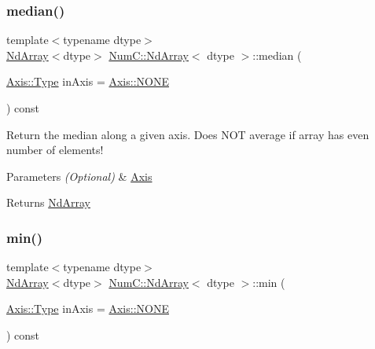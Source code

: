 \subsubsection{\texorpdfstring{median()}{median()}}
{\footnotesize\ttfamily template$<$typename dtype$>$ \\
\mbox{\hyperlink{class_num_c_1_1_nd_array}{Nd\+Array}}$<$dtype$>$ \mbox{\hyperlink{class_num_c_1_1_nd_array}{Num\+C\+::\+Nd\+Array}}$<$ dtype $>$\+::median (\begin{DoxyParamCaption}\item[{\mbox{\hyperlink{struct_num_c_1_1_axis_a8e689044ef1941a03482e730c5e7ebb3}{Axis\+::\+Type}}}]{in\+Axis = {\ttfamily \mbox{\hyperlink{struct_num_c_1_1_axis_a8e689044ef1941a03482e730c5e7ebb3a0ae033c4226f7184bf0050b101e7ed94}{Axis\+::\+N\+O\+NE}}} }\end{DoxyParamCaption}) const\hspace{0.3cm}{\ttfamily [inline]}}

Return the median along a given axis. Does N\+OT average if array has even number of elements!


\begin{DoxyParams}{Parameters}
{\em (\+Optional)} & \mbox{\hyperlink{struct_num_c_1_1_axis}{Axis}} \\
\hline
\end{DoxyParams}
\begin{DoxyReturn}{Returns}
\mbox{\hyperlink{class_num_c_1_1_nd_array}{Nd\+Array}} 
\end{DoxyReturn}
\mbox{\label{class_num_c_1_1_nd_array_a1f4c77688334d3760f4df54137ce9c32}} 
\subsubsection{\texorpdfstring{min()}{min()}}
{\footnotesize\ttfamily template$<$typename dtype$>$ \\
\mbox{\hyperlink{class_num_c_1_1_nd_array}{Nd\+Array}}$<$dtype$>$ \mbox{\hyperlink{class_num_c_1_1_nd_array}{Num\+C\+::\+Nd\+Array}}$<$ dtype $>$\+::min (\begin{DoxyParamCaption}\item[{\mbox{\hyperlink{struct_num_c_1_1_axis_a8e689044ef1941a03482e730c5e7ebb3}{Axis\+::\+Type}}}]{in\+Axis = {\ttfamily \mbox{\hyperlink{struct_num_c_1_1_axis_a8e689044ef1941a03482e730c5e7ebb3a0ae033c4226f7184bf0050b101e7ed94}{Axis\+::\+N\+O\+NE}}} }\end{DoxyParamCaption}) const\hspace{0.3cm}{\ttfamily [inline]}}

